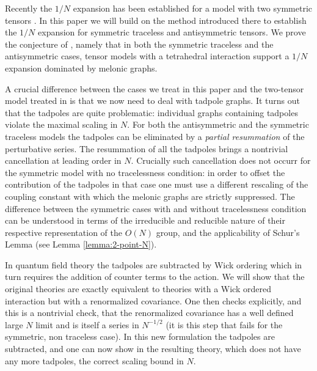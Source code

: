 \documentclass[10pt]{article}
\theoremstyle{plain}
\theoremstyle{definition}
\begin{document}
Recently the $1/N$ expansion has been established for a model with two symmetric tensors \cite{Gurau:2017qya}. In this paper we will build on the method introduced there to establish the $1/N$ expansion for 
symmetric traceless and antisymmetric tensors. We prove the conjecture of \cite{Klebanov:2017nlk}, namely that in both the symmetric traceless and the antisymmetric cases, tensor models with a tetrahedral interaction support a $1/N$ expansion dominated by melonic graphs.
 
A crucial difference between the cases we treat in this paper and the two-tensor model treated in \cite{Gurau:2017qya}
is that we now need to deal with tadpole graphs. It turns out that the tadpoles are quite problematic: individual graphs containing tadpoles violate the 
maximal scaling in $N$. For both the antisymmetric and the symmetric traceless models the tadpoles can be eliminated by a \emph{partial resummation} of the perturbative series.
The resummation of all the tadpoles brings a nontrivial cancellation at leading order in $N$. 
Crucially such cancellation does not occurr for the  
symmetric model with no tracelessness condition: in order to offset the contribution of the tadpoles in that case one must use a different rescaling of the coupling constant with which
the  melonic graphs are strictly suppressed. The difference between the symmetric cases with and without tracelessness condition can be understood in terms of the irreducible and reducible nature of their respective representation of the $O(N)$ group, and the applicability of Schur's Lemma (see Lemma \ref{lemma:2-point-N}).

In quantum field theory the tadpoles are subtracted by Wick ordering which in turn requires the addition of counter terms to the action. We will show that the original 
theories are exactly equivalent to theories with a Wick ordered interaction but with a renormalized covariance. One then checks explicitly, and this is a nontrivial check, 
that the renormalized covariance has a well defined large $N$ limit and is itself a series in $N^{-1/2}$ (it is this step that fails for the symmetric, non traceless case).
In this new formulation the tadpoles are subtracted, and one can now show in the resulting theory, which does not have any more tadpoles, the correct scaling bound in $N$.
\end{document}
